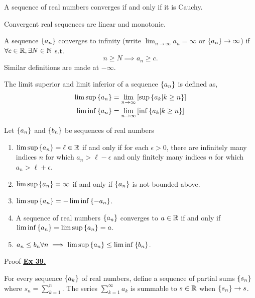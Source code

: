 \begin{thm}
    A sequence of real numbers converges if and only if it is Cauchy.
\end{thm}
\begin{thm}
    Convergent real sequences are linear and monotonic.
\end{thm}

\begin{defn} 
    A sequence $\left\{a_n\right\}$ converges to infinity (write $\lim_{n \to \infty} a_n = \infty$ or $\left\{a_n\right\}\to \infty$) if $\forall c \in \mathbb{R}, \exists N \in \mathbb{N}$ s.t.
    \[ n\geq N \implies a_n \geq c.\]
    Similar definitions are made at $-\infty$.
\end{defn}

\begin{defn}
    The limit superior and limit inferior of a sequence $\left\{a_n\right\}$ is defined as,
    \begin{align*}
        \limsup\left\{a_n\right\} &= \lim_{n\to\infty} \left[\sup\left\{a_k | k \geq n\right\}\right] \\
        \liminf\left\{a_n\right\} &= \lim_{n\to\infty} \left[\inf\left\{a_k | k \geq n\right\}\right] \\
    \end{align*}
\end{defn}

\begin{prop}
    Let $\left\{a_n\right\}$ and $\left\{b_n\right\}$ be sequences of real numbers
    \begin{enumerate}[label=(\roman*)]
        \item $\limsup\left\{a_n\right\} = \ell \in \mathbb{R}$ if and only if for each $\epsilon > 0$, there are infinitely many indices $n$ for which $a_n > \ell - \epsilon$ and only finitely many indices $n$ for which $a_n > \ell + \epsilon$.
        \item $\limsup\left\{a_n\right\} = \infty$ if and only if $\left\{a_n\right\}$ is not bounded above.
        \item $\limsup\left\{a_n\right\} = -\liminf\left\{-a_n\right\}$.
        \item A sequence of real numbers $\left\{a_n\right\}$ converges to $a \in \mathbb{R}$ if and only if $\liminf\left\{a_n\right\} = \limsup\left\{a_n\right\} = a$.
        \item $a_n \leq b_n \forall n \implies \limsup\left\{a_n\right\} \leq \liminf\left\{b_n\right\}$.
    \end{enumerate}
    Proof \hyperref[ex:39]{\underline{\textbf{Ex 39.}}}
\end{prop}

\begin{defn}
    For every sequence $\left\{a_k\right\}$ of real numbers, define a sequence of partial sums $\left\{s_n\right\}$ where $s_n = \sum_{k=1}^{n}$.
    The series $\sum_{k=1}^{\infty} a_k$ is summable to $s\in\mathbb{R}$ when $\left\{s_n\right\}\to s$.
\end{defn}

